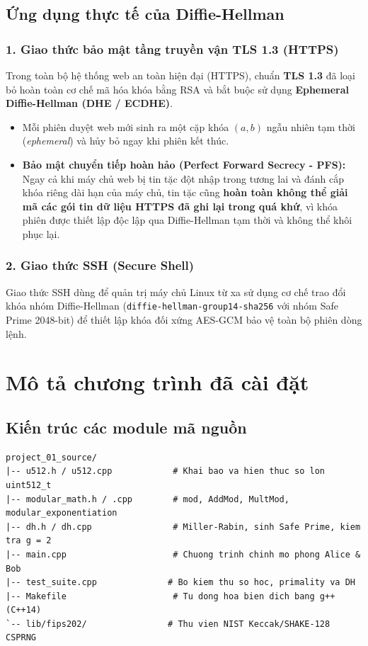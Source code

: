 \documentclass[12pt,a4paper]{article}
\theoremstyle{plain}
\begin{document}
\subsection{Ứng dụng thực tế của Diffie-Hellman}

\subsubsection{1. Giao thức bảo mật tầng truyền vận TLS 1.3 (HTTPS)}
Trong toàn bộ hệ thống web an toàn hiện đại (HTTPS), chuẩn \textbf{TLS 1.3} đã loại bỏ hoàn toàn cơ chế mã hóa khóa bằng RSA và bắt buộc sử dụng \textbf{Ephemeral Diffie-Hellman (DHE / ECDHE)}.
\begin{itemize}
    \item Mỗi phiên duyệt web mới sinh ra một cặp khóa $(a, b)$ ngẫu nhiên tạm thời (\textit{ephemeral}) và hủy bỏ ngay khi phiên kết thúc.
    \item \textbf{Bảo mật chuyển tiếp hoàn hảo (Perfect Forward Secrecy - PFS):} Ngay cả khi máy chủ web bị tin tặc đột nhập trong tương lai và đánh cắp khóa riêng dài hạn của máy chủ, tin tặc cũng \textbf{hoàn toàn không thể giải mã các gói tin dữ liệu HTTPS đã ghi lại trong quá khứ}, vì khóa phiên được thiết lập độc lập qua Diffie-Hellman tạm thời và không thể khôi phục lại.
\end{itemize}

\subsubsection{2. Giao thức SSH (Secure Shell)}
Giao thức SSH dùng để quản trị máy chủ Linux từ xa sử dụng cơ chế trao đổi khóa nhóm Diffie-Hellman (\texttt{diffie-hellman-group14-sha256} với nhóm Safe Prime 2048-bit) để thiết lập khóa đối xứng AES-GCM bảo vệ toàn bộ phiên dòng lệnh.

\newpage
\section{Mô tả chương trình đã cài đặt}

\subsection{Kiến trúc các module mã nguồn}
\begin{verbatim}
project_01_source/
|-- u512.h / u512.cpp            # Khai bao va hien thuc so lon uint512_t
|-- modular_math.h / .cpp        # mod, AddMod, MultMod, modular_exponentiation
|-- dh.h / dh.cpp                # Miller-Rabin, sinh Safe Prime, kiem tra g = 2
|-- main.cpp                     # Chuong trinh chinh mo phong Alice & Bob
|-- test_suite.cpp              # Bo kiem thu so hoc, primality va DH
|-- Makefile                     # Tu dong hoa bien dich bang g++ (C++14)
`-- lib/fips202/                # Thu vien NIST Keccak/SHAKE-128 CSPRNG
\end{verbatim}
\end{document}
